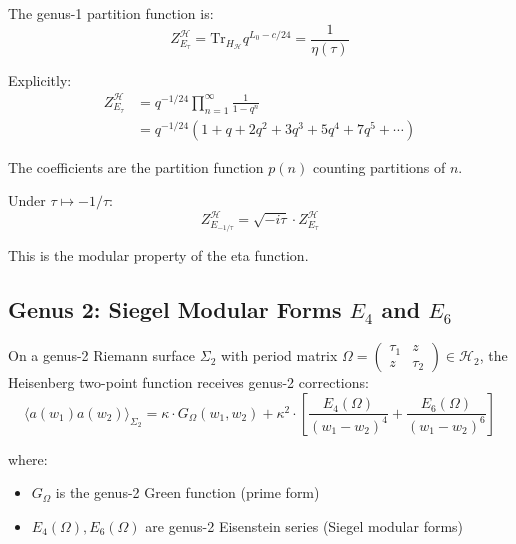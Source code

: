 \begin{computation}\label{comp:heisenberg-partition-g1}
The genus-1 partition function is:
\begin{equation}
Z_{E_\tau}^{\mathcal{H}} = \text{Tr}_{H_{\mathcal{H}}} q^{L_0 - c/24} 
= \frac{1}{\eta(\tau)}
\end{equation}

Explicitly:
\begin{align}
Z_{E_\tau}^{\mathcal{H}} &= q^{-1/24} \prod_{n=1}^{\infty} \frac{1}{1 - q^n} \\
&= q^{-1/24}(1 + q + 2q^2 + 3q^3 + 5q^4 + 7q^5 + \cdots)
\end{align}

The coefficients are the partition function $p(n)$ counting partitions of $n$.

Under $\tau \mapsto -1/\tau$:
$$Z_{E_{-1/\tau}}^{\mathcal{H}} = \sqrt{-i\tau} \cdot Z_{E_\tau}^{\mathcal{H}}$$

This is the modular property of the eta function.
\end{computation}

\subsection{Genus 2: Siegel Modular Forms $E_4$ and $E_6$}
\label{subsec:heisenberg-genus-two}

\begin{theorem}\label{thm:heisenberg-genus-two}
On a genus-2 Riemann surface $\Sigma_2$ with period matrix 
$\Omega = \begin{pmatrix} \tau_1 & z \\ z & \tau_2 \end{pmatrix} \in \mathcal{H}_2$, 
the Heisenberg two-point function receives genus-2 corrections:
\begin{equation}
\langle a(w_1) a(w_2) \rangle_{\Sigma_2} = \kappa \cdot G_{\Omega}(w_1, w_2) 
+ \kappa^2 \cdot \left[\frac{E_4(\Omega)}{(w_1-w_2)^4} + \frac{E_6(\Omega)}{(w_1-w_2)^6}\right]
\end{equation}

where:
\begin{itemize}
\item $G_{\Omega}$ is the genus-2 Green function (prime form)
\item $E_4(\Omega), E_6(\Omega)$ are genus-2 Eisenstein series (Siegel modular forms)
\end{itemize}
\end{theorem}

